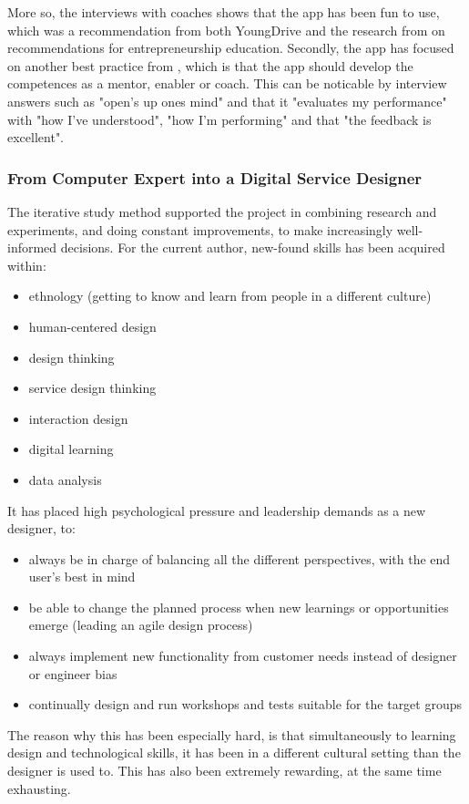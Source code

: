   More so, the interviews with coaches shows that the app has been fun to use, which was a recommendation from both YoungDrive and the research from \cite{dickson} on recommendations for entrepreneurship education. Secondly, the app has focused on another best practice from \cite{dickson}, which is that the app should develop the competences as a mentor, enabler or coach. This can be noticable by interview answers such as "open's up ones mind" and that it "evaluates my performance" with "how I've understood", "how I'm performing" and that "the feedback is excellent".

  \subsubsection{From Computer Expert into a Digital Service Designer}
  The iterative study method supported the project in combining research and experiments, and doing constant improvements, to make increasingly well-informed decisions. For the current author, new-found skills has been acquired within:
  \begin{itemize}
  \item ethnology (getting to know and learn from people in a different culture)
  \item human-centered design
  \item design thinking
  \item service design thinking
  \item interaction design
  \item digital learning
  \item data analysis
  \end{itemize}

  It has placed high psychological pressure and leadership demands as a new designer, to:
  \begin{itemize}
  \item always be in charge of balancing all the different perspectives, with the end user's best in mind
  \item be able to change the planned process when new learnings or opportunities emerge (leading an agile design process)
  \item always implement new functionality from customer needs instead of designer or engineer bias
  \item continually design and run workshops and tests suitable for the target groups
  \end{itemize}

  The reason why this has been especially hard, is that simultaneously to learning design and technological skills, it has been in a different cultural setting than the designer is used to. This has also been extremely rewarding, at the same time exhausting.

